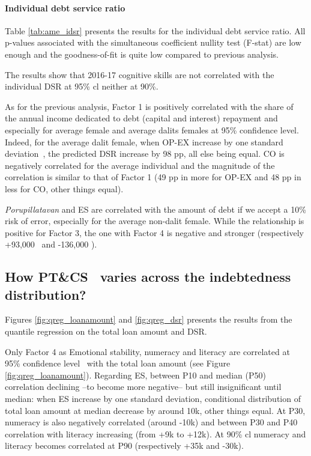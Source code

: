 \documentclass[a4paper, 11pt, onecolumn]{article}
\newcommand{\sd}{standard deviation}
\newcommand{\aebe}{all else being equal}
\newcommand{\ote}{other things equal}
\newcommand{\cl}{confidence level}
\newcommand{\PTCS}{PT\&CS}
\begin{document}


\paragraph{Individual debt service ratio}
Table \ref{tab:ame_idsr} presents the results for the individual debt service ratio.
All p-values associated with the simultaneous coefficient nullity test (F-stat) are low enough and the goodness-of-fit is quite low compared to previous analysis.

The results show that 2016-17 cognitive skills are not correlated with the individual DSR at 95\% cl neither at 90\%.

As for the previous analysis, Factor 1 is positively correlated with the share of the annual income dedicated to debt (capital and interest) repayment and especially for average female and average dalits females at 95\% \cl.
Indeed, for the average dalit female, when OP-EX increase by one \sd~, the predicted DSR increase by 98 pp, \aebe.
CO is negatively correlated for the average individual and the magnitude of the correlation is similar to that of Factor 1 (49 pp in more for OP-EX and 48 pp in less for CO, \ote).

\textit{Porupillatavan} and ES are correlated with the amount of debt if we accept a 10\% risk of error, especially for the average non-dalit female.
While the relationship is positive for Factor 3, the one with Factor 4 is negative and stronger (respectively +93,000 \rupee~and -136,000 \rupee).



	\subsection{How \PTCS~ varies across the indebtedness distribution?}

Figures \ref{fig:qreg_loanamount} and \ref{fig:qreg_dsr} presents the results from the quantile regression on the total loan amount and DSR.

Only Factor 4 as Emotional stability, numeracy and literacy are correlated at 95\% \cl~ with the total loan amount (see Figure \ref{fig:qreg_loanamount}).
Regarding ES, between P10 and median (P50) correlation declining --to become more negative-- but still insignificant until median: when ES increase by one \sd, conditional distribution of total loan amount at median decrease by around \rupee10k, \ote.
At P30, numeracy is also negatively correlated (around -\rupee10k) and between P30 and P40 correlation with literacy increasing (from +\rupee9k to +\rupee12k).
At 90\% cl numeracy and literacy becomes correlated at P90 (respectively +\rupee35k and -\rupee30k).
\end{document}
